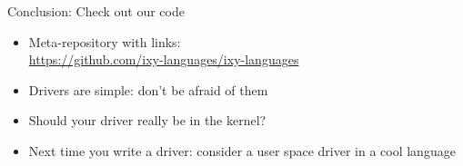 \documentclass[NET,english,aspectratio=169,notitleframe]{tumbeamer}
\begin{document}

\begin{frame}{Conclusion: Check out our code}
\centering {}
\begin{itemize}
\item Meta-repository with links:\\\url{https://github.com/ixy-languages/ixy-languages}
\item Drivers are simple: don't be afraid of them
\item Should your driver really be in the kernel?
\item Next time you write a driver: consider a user space driver in a cool language
\end{itemize}
\end{frame}
\end{document}
